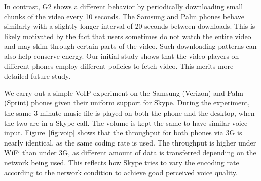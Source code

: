 In contrast, G2 shows a different behavior by periodically 
downloading small chunks of the video every 10 seconds. The Samsung 
and Palm phones behave similarly with a slightly longer interval of 
20 seconds between downloads. This is likely motivated by the fact 
that users sometimes do not watch the entire video and may skim 
through certain parts of the video. Such downloading patterns can 
also help conserve energy. Our initial study shows that the video 
players on different phones employ different policies to fetch video. 
This merits more detailed future study. 






\label{sec:voip}




We carry out a simple VoIP experiment on the Samsung (Verizon) and 
Palm (Sprint) phones given their uniform support for Skype. During 
the experiment, the same 3-minute music file is played on both the phone and 
the desktop, when the two are in a Skype call. The volume is kept 
the same to have similar voice input. Figure~\ref{fig:voip} shows 
that the throughput for both phones via 3G is nearly identical, as 
the same coding rate is used. The throughput is higher under WiFi 
than under 3G, as different amount of data is transferred depending 
on the network being used. This reflects how Skype tries to vary 
the encoding rate according to the network condition to achieve 
good perceived voice quality.



